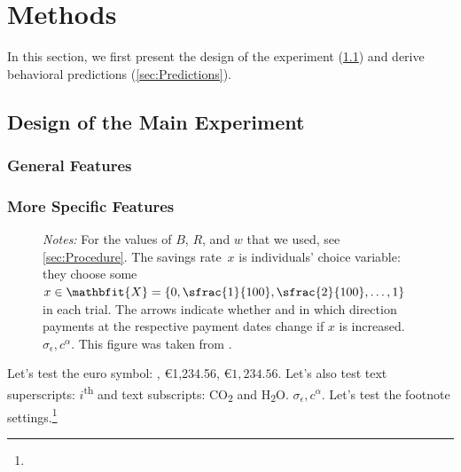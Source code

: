 



\section{Methods}
\label{sec:Methods}

In this section, we first present the design of the experiment (\ref{sec:design}) and derive behavioral predictions (\ref{sec:Predictions}).

\subsection{Design of the Main Experiment}
\label{sec:design}

\subsubsection{General Features}
\blindtext

\subsubsection{More Specific Features}
\blindtext

\begin{figure}[tp!]
	\RawFloats
	\centering
	
	\smallskip
	
	\bigskip
	\begin{minipage}{\textwidth}%
		\footnotesize\setlength{\baselineskip}{11pt}%
		\textit{Notes:} For the values of $B$, $R$, and $w$ that we used, see \autoref{sec:Procedure}. The savings rate~$x$ is individuals' choice variable: they choose some $x \in \mathbfit{X} = {\{0, \sfrac{1}{100}, \sfrac{2}{100}, \dots, 1\}}$ in each trial.
		The arrows indicate whether and in which direction payments at the respective payment dates change if $x$ is increased.
		$\sigma_\epsilon, c^\alpha$.
		This figure was taken from \cite{Dertwinkel-Kalt2017}.
	\end{minipage}
\end{figure}

Let's test the euro symbol: \texteuro, \euro 1,234.56, $\euro 1{,}234.56$. Let's also test text superscripts: $i$\textsuperscript{th} and text subscripts: CO\textsubscript{2} and H\textsubscript{2}O.
$\sigma_\epsilon, c^\alpha$.
\blindtext
Let's test the footnote settings.\footnote{\blindmathfalse\blindtext\blindmathtrue}

